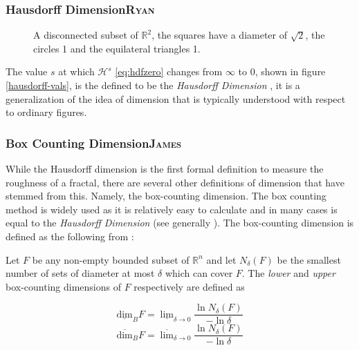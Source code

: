 \documentclass[a4paper,11pt,twoside]{article}
\begin{document}
\subsubsection{Hausdorff Dimension\hfill{}\textsc{Ryan}}
\label{sec:orgea707a2}

\begin{figure}
\centering

\caption{\label{abstract-shape}A disconnected subset of \(\mathbb{R}^{2}\), the squares have a diameter of \(\sqrt{2}\), the circles 1 and the equilateral triangles 1.}
\end{figure}


The value \(s\) at which \(\mathcal{H}^{s}\) \eqref{eq:hdfzero} changes from \(\infty\) to 0, shown in figure \ref{hausdorff-vals},  is the defined to be the \emph{Hausdorff Dimension} \cite[\S 2.2]{falconerFractalGeometryMathematical2003b}, it is a generalization of the idea of dimension that is typically understood with respect to ordinary figures.

\subsubsection{Box Counting Dimension\hfill{}\textsc{James}}
\label{box-count-dim}
While the Hausdorff dimension is the first formal definition to measure
the roughness of a fractal, there are several other definitions of dimension
that have stemmed from this. Namely, the box-counting dimension. The box
counting method is widely used as it is relatively easy to calculate \cite[p. 41]{falconerFractalGeometryMathematical2003b}
and in many cases is equal to the \emph{Hausdorff Dimension}  \cite[p. 11]{markpollicottFractalsDimensionTheory2005} (see generally \cite{ListFractalsHausdorff2020}).
The box-counting dimension is defined as the following from
\cite{falconerFractalGeometryMathematical2003}:

Let \(F\) be any non-empty bounded subset of \(\mathbb{R}^n\) and let \(N_\delta(F)\) be the smallest
number of sets of diameter at most \(\delta\) which can cover \(F\). The \emph{lower} and \emph{upper}
box-counting dimensions of \(F\) respectively are defined as

\begin{equation*}
    \underline{\text{dim}}_BF = \underline{\lim}_{\delta \to 0} \frac{\ln N_\delta(F)}{-\ln \delta}
\end{equation*}
\begin{equation*}
\overline{\text{dim}}_BF = \overline{\lim}_{\delta \to 0} \frac{\ln N_\delta(F)}{-\ln \delta}
\end{equation*}
\end{document}
